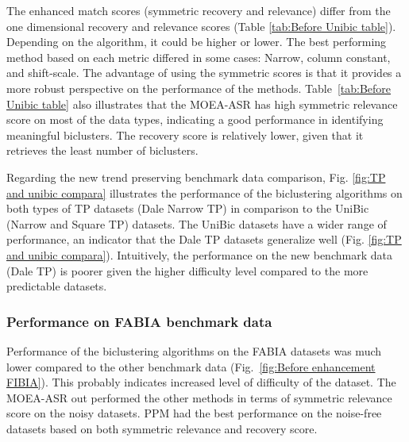 The enhanced match scores (symmetric recovery and relevance) differ from the one dimensional recovery and relevance scores (Table \ref{tab:Before Unibic table}). Depending on the algorithm, it could be higher or lower. The best performing method based on each metric differed in some cases: Narrow, column constant, and shift-scale. The advantage of using the symmetric scores is that it provides a more robust perspective on the performance of the methods.
Table~\ref{tab:Before Unibic table} also illustrates that the MOEA-ASR has high symmetric relevance score on most of the data types, indicating a good performance in identifying meaningful biclusters. The recovery score is relatively lower, given that it retrieves the least number of biclusters. 

Regarding the new trend preserving benchmark data comparison, Fig. \ref{fig:TP and unibic compara} illustrates the performance of the biclustering algorithms on both types of TP datasets (Dale Narrow TP) in comparison to the UniBic (Narrow and Square TP) datasets. The UniBic datasets have a wider range of performance, an indicator that the Dale TP datasets generalize well (Fig. \ref{fig:TP and unibic compara}). Intuitively, the performance on the new benchmark data (Dale TP) is poorer given the higher difficulty level compared to the more predictable datasets. 








\subsubsection{Performance on FABIA benchmark data}
Performance of the biclustering algorithms on the FABIA datasets was much lower compared to the other benchmark data (Fig.~\ref{fig:Before enhancement FIBIA}). This probably indicates increased level of difficulty of the dataset. The MOEA-ASR out performed the other methods in terms of symmetric relevance score on the noisy datasets. PPM had the best performance on the noise-free datasets based on both symmetric relevance and recovery score. 

